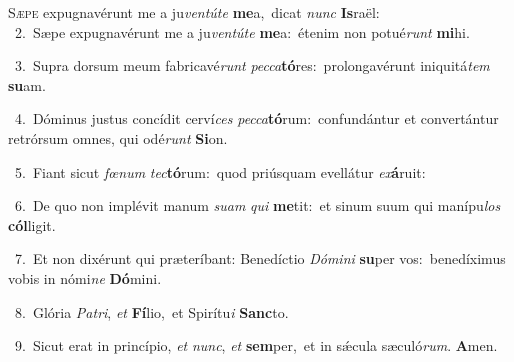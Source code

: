 \lettrine{\initial\textcolor{\initialcolor}{S}}{æpe} expugnavérunt me a ju\-\textit{ven}\-\textit{tú}\textit{te} \textbf{me}\-a,~\star dicat \textit{nunc} \textbf{Is}\-raël:\\
{\numbfont\textcolor{\numbcolor}{~2.}}~Sæpe expugnavérunt me a ju\-\textit{ven}\-\textit{tú}\textit{te} \textbf{me}\-a:~\star étenim non potué\textit{runt} \textbf{mi}\-hi.\par
{\numbfont\textcolor{\numbcolor}{~3.}}~Supra dorsum meum fabricavé\textit{runt} \textit{pec}\-\textit{ca}\textbf{tó}res:~\star prolongavérunt iniquitá\textit{tem} \textbf{su}\-am.\par
{\numbfont\textcolor{\numbcolor}{~4.}}~Dóminus justus concídit cerví\textit{ces} \textit{pec}\-\textit{ca}\textbf{tó}rum:~\star confundántur et convertántur retrórsum omnes, qui odé\textit{runt} \textbf{Si}\-on.\par
{\numbfont\textcolor{\numbcolor}{~5.}}~Fiant sicut \textit{fœ}\-\textit{num} \textit{tec}\-\textbf{tó}rum:~\star quod priúsquam evellátur \textit{ex}\-\textbf{á}ruit:\par
{\numbfont\textcolor{\numbcolor}{~6.}}~De quo non implévit manum \textit{su}\-\textit{am} \textit{qui} \textbf{me}\-tit:~\star et sinum suum qui manípu\textit{los} \textbf{cól}\-ligit.\par
{\numbfont\textcolor{\numbcolor}{~7.}}~Et non dixérunt qui præteríbant: Benedíctio \textit{Dó}\-\textit{mi}\textit{ni} \textbf{su}\-per vos:~\star benedíximus vobis in nómi\textit{ne} \textbf{Dó}\-mini.\par
{\numbfont\textcolor{\numbcolor}{~8.}}~Glória \textit{Pa}\-\textit{tri}, \textit{et} \textbf{Fí}\-lio,~\star et Spirítu\textit{i} \textbf{Sanc}\-to.\par
{\numbfont\textcolor{\numbcolor}{~9.}}~Sicut erat in princípio, \textit{et} \textit{nunc}\-, \textit{et} \textbf{sem}\-per,~\star et in sǽcula sæculó\-\textit{rum}\-. \textbf{A}\-men.\par
